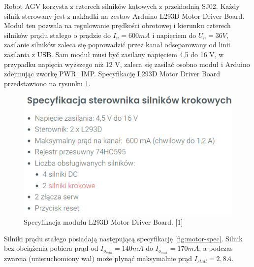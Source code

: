 \documentclass{report}
\begin{document}
Robot AGV korzysta z czterech silników kątowych z przekładnią SJ02. Każdy silnik sterowany jest z nakładki na zestaw Arduino L293D Motor Driver Board. Moduł ten pozwala na regulowanie prędkości obrotowej i kierunku czterech silników prądu stałego o prądzie do $I_n=600 mA$ i napięciem do $U_n=36 V$, zasilanie silników zaleca się poprowadzić przez kanał odseparowany od linii zasilania z USB. Sam moduł musi być zasilany napięciem 4,5 do 16 V, w przypadku napięcia wyższego niż 12 V, zaleca się zasilać osobno moduł i Arduino zdejmując zworkę PWR\_IMP. Specyfikację L293D Motor Driver Board przedstawiono na rysunku \ref{fig:motor-driver-spec}.

\begin{figure}[H]
    \centering
    \includegraphics{src/tech_specifications/L293D Motor Driver Board.png}
    \caption{Specyfikacja modułu L293D Motor Driver Board. [1]}
    \label{fig:motor-driver-spec}
\end{figure}

Silniki prądu stałego posiadają następującą specyfikację \ref{fig:motor-spec}. Silnik bez obciążenia pobiera prąd od $I_{o_{min}}=140 mA$ do $I_{o_{max}}=170 mA$, a podczas zwarcia (unieruchomiony wał) może płynąć maksymalnie prąd $I_{stall}=2,8 A$.
\end{document}
